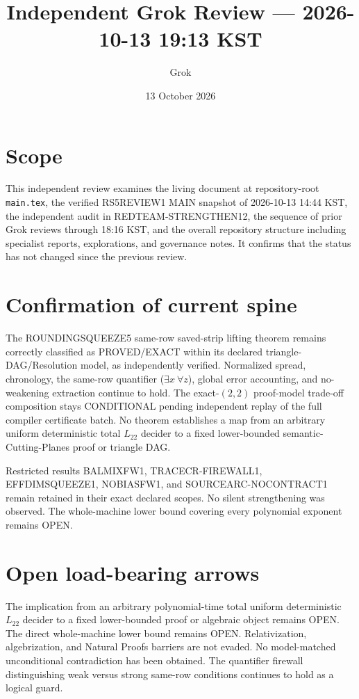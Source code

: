\documentclass[11pt]{article}
\title{Independent Grok Review --- 2026-10-13 19:13 KST}
\author{Grok}
\date{13 October 2026}
\begin{document}
\maketitle

\begin{center}
\end{center}

\section{Scope}
This independent review examines the living document at repository-root \texttt{main.tex}, the verified RS5REVIEW1 MAIN snapshot of 2026-10-13 14:44 KST, the independent audit in REDTEAM-STRENGTHEN12, the sequence of prior Grok reviews through 18:16 KST, and the overall repository structure including specialist reports, explorations, and governance notes. It confirms that the status has not changed since the previous review.

\section{Confirmation of current spine}
The ROUNDINGSQUEEZE5 same-row saved-strip lifting theorem remains correctly classified as PROVED/EXACT within its declared triangle-DAG/Resolution model, as independently verified. Normalized spread, chronology, the same-row quantifier (\(\exists x\ \forall z\)), global error accounting, and no-weakening extraction continue to hold. The exact-$(2,2)$ proof-model trade-off composition stays CONDITIONAL pending independent replay of the full compiler certificate batch. No theorem establishes a map from an arbitrary uniform deterministic total $L_{22}$ decider to a fixed lower-bounded semantic-Cutting-Planes proof or triangle DAG.

Restricted results BALMIXFW1, TRACECR-FIREWALL1, EFFDIMSQUEEZE1, NOBIASFW1, and SOURCEARC-NOCONTRACT1 remain retained in their exact declared scopes. No silent strengthening was observed. The whole-machine lower bound covering every polynomial exponent remains OPEN.

\section{Open load-bearing arrows}
The implication from an arbitrary polynomial-time total uniform deterministic $L_{22}$ decider to a fixed lower-bounded proof or algebraic object remains OPEN. The direct whole-machine lower bound remains OPEN. Relativization, algebrization, and Natural Proofs barriers are not evaded. No model-matched unconditional contradiction has been obtained. The quantifier firewall distinguishing weak versus strong same-row conditions continues to hold as a logical guard.
\end{document}
